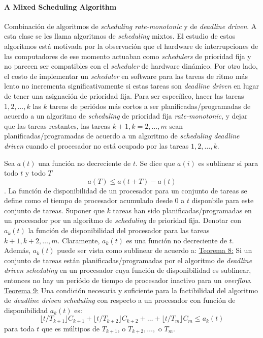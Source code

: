 \paragraph{\textnormal{\textbf{A Mixed Scheduling Algorithm}}}
Combinación de algoritmos de \emph{scheduling rate-monotonic} y de \emph{deadline driven}. A esta clase se les llama algoritmos de \emph{scheduling} mixtos. El estudio de estos algoritmos está motivada por la observación que el hardware de interrupciones de las computadores de ese momento actuaban como \emph{schedulers} de prioridad fija y no parecen ser compatibles con el \emph{scheduler} de hardware dinámico. Por otro lado, el costo de implementar un \emph{scheduler} en software para las tareas de ritmo más lento no incrementa significativamente si estas tareas son \emph{deadline driven} en lugar de tener una asignación de prioridad fija. Para ser específico, hacer las tareas $1, 2, \dots, k$ las $k$ tareas de periódos más cortos a ser planificadas/programadas de acuerdo a un algoritmo de \emph{scheduling} de prioridad fija \emph{rate-monotonic}, y dejar que las tareas restantes, las tareas $k + 1, k = 2, \dots, m$ sean planificadas/programadas de acuerdo a un algoritmo de \emph{scheduling deadline driven} cuando el procesador no está ocupado por las tareas $1, 2, \dots, k$.

Sea $a(t)$ una función no decreciente de $t$. Se dice que $a(i)$ es sublinear si para todo $t$ y todo $T$ $$a(T) \leq a(t + T) - a(t)$$. La función de disponibilidad de un procesador para un conjunto de tareas se define como el tiempo de procesador acumulado desde 0 a $t$ disponbile para este conjunto de tareas. Suponer que $k$ tareas han sido planificadas/programadas en un procesador por un algoritmo de \emph{scheduling} de prioridad fija. Denotar con $a_k(t)$ la función de disponibilidad del procesador para las tareas $k + 1, k + 2, \dots, m$. Claramente, $a_k(t)$ es una función no decreciente de $t$. Además, $a_k(t)$ puede ser vista como sublinear de acuerdo a: \underline{Teorema 8:} Si un conjunto de tareas están planificadas/programadas por el algoritmo de \emph{deadline driven scheduling} en un procesador cuya función de disponibilidad es sublinear, entonces no hay un periódo de tiempo de procesador inactivo para un \emph{overflow}. \underline{Teorema 9:} Una condición necesaria y suficiente para la factibilidad del algoritmo de \emph{deadline driven scheduling} con respecto a un procesador con función de disponibilidad $a_k(t)$ es: $$\lfloor t/T_{k+1} \rfloor C_{k+1} + \lfloor t/T_{k+2} \rfloor C_{k+2} + \dots + \lfloor t/T_m \rfloor C_m \leq a_k(t)$$ para toda $t$ que es múltipos de $T_{k+1}$, o $T_{k+2}, \dots, $ o $T_m$.

